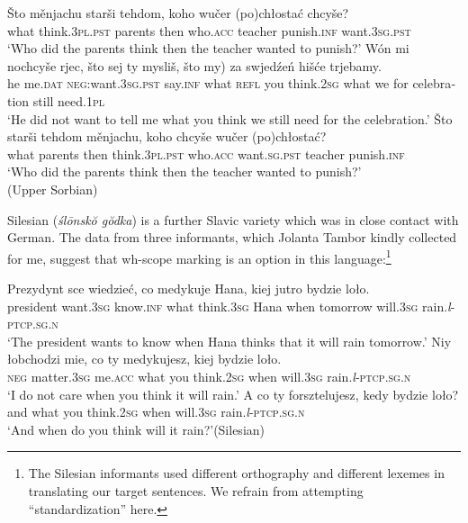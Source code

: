 \documentclass[output=paper,colorlinks,citecolor=brown]{langscibook}
\begin{document}
\begin{otherlanguage}{english}
\ea\label{ex:fanselow:12}
\ea     
\gll    Što 	měnjachu 	starši 	tehdom, 	koho 	wučer 	(po)chłostać 	chcyše? \\
        what	think.3\textsc{pl}.\textsc{pst}	 parents	then	who.\textsc{acc}	teacher	punish.\textsc{inf}	want.3\textsc{sg}.\textsc{pst}  	  \\
\glt ‘Who did the parents think then the teacher wanted to punish?' 
\label{ex:fanselow:12a}
\ex     
\gll Wón 	mi 	nochcyše 	rjec, 	što	sej 	ty 		mysliš, što 	\minsp{(} my) 	za 	swjedźeń hišće		trjebamy. \\
    he 	me.\textsc{dat} 	\textsc{neg}:want.3\textsc{sg}.\textsc{pst} 	say.\textsc{inf} 	what 	\textsc{refl} 	you 	think.2\textsc{sg} 	what 	{} we 	for 	celebration still 		need.1\textsc{pl} 	  \\
\glt ‘He did not want to tell me what you think we still need for the celebration.'
\label{ex:fanselow:12b}
\ex     
\gll Što 	starši 	tehdom 	měnjachu, 	koho 	chcyše 	wučer 	(po)chłostać? \\
    what 	parents 	then 	think.3\textsc{pl}.\textsc{pst} 	who.\textsc{acc}	 	want.\textsc{sg}.\textsc{pst} 	teacher 	punish.\textsc{inf}  	  \\
\glt ‘Who did the parents think then the teacher wanted to punish?'\\\hfill (Upper Sorbian)
\label{ex:fanselow:12c}
\z\z


\noindent Silesian (\textit{ślōnskŏ gŏdka}) is a further Slavic variety which was in close contact with German. The data from three informants, which Jolanta Tambor kindly collected for me, suggest that wh-scope marking is an option in this language:\footnote{The Silesian informants used different orthography and different lexemes in translating our target sentences. We refrain from attempting “standardization” here.
} 

\ea\label{ex:fanselow:15}
\ea     
\gll Prezydynt 	sce 	wiedzieć, 	co 	medykuje 	Hana, 	kiej 	jutro 	bydzie loło. \\
    president 	want.3\textsc{sg} 	know.\textsc{inf} 	what 	think.3\textsc{sg} 	Hana 	when 	tomorrow	will.3\textsc{sg} rain.\textit{l}-\textsc{ptcp}.\textsc{sg}.\textsc{n}  \\ 
\glt ‘The president wants to know when Hana thinks that it will rain tomorrow.'
\label{ex:fanselow:15a}
\ex     
\gll Niy 	łobchodzi 	mie, 	co 	ty 	medykujesz, 	kiej 	bydzie 	loło. \\
    \textsc{neg} 	matter.3\textsc{sg} me.\textsc{acc} what you think.2\textsc{sg} when 	will.3\textsc{sg} rain.\textit{l}-\textsc{ptcp}.\textsc{sg}.\textsc{n}  \\ 
\glt ‘I do not care when you think it will rain.'
\label{ex:fanselow:15b}
\ex     
\gll A 	co 	ty 	forsztelujesz, 	kedy 	bydzie 	loło? \\
    and 	what 	you	think.2\textsc{sg} 	when will.3\textsc{sg} rain.\textit{l}-\textsc{ptcp}.\textsc{sg}.\textsc{n}   \\ 
\glt ‘And when do you think will it rain?'\hfill (Silesian)
\label{ex:fanselow:15c}
\z\z



\end{otherlanguage}
\end{document}
